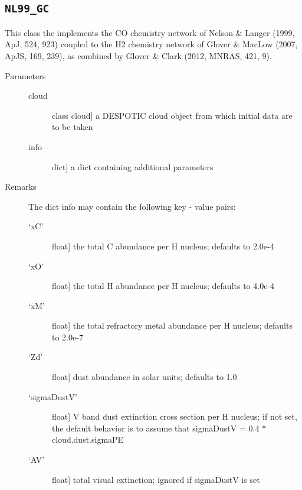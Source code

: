 \documentclass[letterpaper,10pt,english]{sphinxmanual}
\begin{document}
\subsection{\texttt{NL99\_GC}}
\label{fulldoc:nl99-gc}

\begin{fulllineitems}
\label{fulldoc:despotic.chemistry.NL99_GC}
This class the implements the CO chemistry network of Nelson \& Langer
(1999, ApJ, 524, 923) coupled to the H2 chemistry network of
Glover \& MacLow (2007, ApJS, 169, 239), as combined by Glover \&
Clark (2012, MNRAS, 421, 9).
\begin{description}
\item[{Parameters}] \leavevmode\begin{description}
\item[{cloud}] \leavevmode{[}class cloud{]}
a DESPOTIC cloud object from which initial data are to be
taken

\item[{info}] \leavevmode{[}dict{]}
a dict containing additional parameters

\end{description}

\item[{Remarks}] \leavevmode
The dict info may contain the following key - value pairs:
\begin{description}
\item[{`xC'}] \leavevmode{[}float{]}
the total C abundance per H nucleus; defaults to 2.0e-4

\item[{`xO'}] \leavevmode{[}float{]}
the total H abundance per H nucleus; defaults to 4.0e-4

\item[{`xM'}] \leavevmode{[}float{]}
the total refractory metal abundance per H
nucleus; defaults to 2.0e-7

\item[{`Zd'}] \leavevmode{[}float{]}
dust abundance in solar units; defaults to 1.0

\item[{`sigmaDustV'}] \leavevmode{[}float{]}
V band dust extinction cross
section per H nucleus; if not set, the default behavior
is to assume that sigmaDustV = 0.4 * cloud.dust.sigmaPE

\item[{`AV'}] \leavevmode{[}float{]}
total visual extinction; ignored if sigmaDustV is set


\end{description}
\end{description}
\end{fulllineitems}
\end{document}

